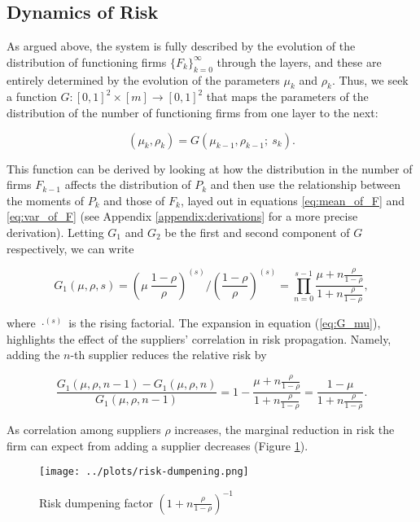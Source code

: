 \documentclass[../../main.tex]{subfiles}
\begin{document}
\subsection{Dynamics of Risk}

As argued above, the system is fully described by the evolution of the distribution of functioning firms $\{ F_k \}^{\infty}_{k = 0}$ through the layers, and these are entirely determined by the evolution of the parameters $\mu_k$ and $\rho_k$. Thus, we seek a function $G: [0, 1]^2 \times [m] \to [0, 1]^2$ that maps the parameters of the distribution of the number of functioning firms from one layer to the next:

\begin{equation}
  (\mu_k, \rho_k) = G(\mu_{k - 1}, \rho_{k - 1}; \ s_k).
\end{equation}

This function can be derived by looking at how the distribution in the number of firms $F_{k - 1}$ affects the distribution of $P_k$ and then use the relationship between the moments of $P_k$ and those of $F_k$, layed out in equations \ref{eq:mean_of_F} and \ref{eq:var_of_F} (see Appendix \ref{appendix:derivations} for a more precise derivation). Letting $G_1$ and $G_2$ be the first and second component of $G$ respectively, we can write

\begin{equation} \label{eq:G_mu}
  G_1(\mu, \rho, s) = \left( \mu \  \frac{1 - \rho}{\rho} \right)^{(s)} \Big/ \left(\frac{1 - \rho}{\rho} \right)^{(s)} = \prod^{s - 1}_{n = 0} \frac{\mu + n \frac{\rho}{1 - \rho}}{1 + n \frac{\rho}{1 - \rho}},
\end{equation}

where $\cdot^{(s)}$ is the rising factorial. The expansion in equation (\ref{eq:G_mu}), highlights the effect of the suppliers' correlation in risk propagation. Namely, adding the $n$-th supplier reduces the relative risk by

\begin{equation}
  \frac{G_1(\mu, \rho, n - 1) - G_1(\mu, \rho, n)}{G_1(\mu, \rho, n - 1)} = 1 - \frac{\mu + n \frac{\rho}{1 - \rho}}{1 + n \frac{\rho}{1 - \rho}} = \frac{1 - \mu}{1 + n \frac{\rho}{1 - \rho}}.
\end{equation}

As correlation among suppliers $\rho$ increases, the marginal reduction in risk the firm can expect from adding a supplier decreases (Figure \ref{fig:risk-dumpening}).


\begin{figure}[H]
  \centering
  \texttt{[image: ../plots/risk-dumpening.png]}
  \caption{Risk dumpening factor $\left(1 + n \frac{\rho}{1 - \rho}\right)^{-1}$}
  \label{fig:risk-dumpening}
\end{figure}
\end{document}
